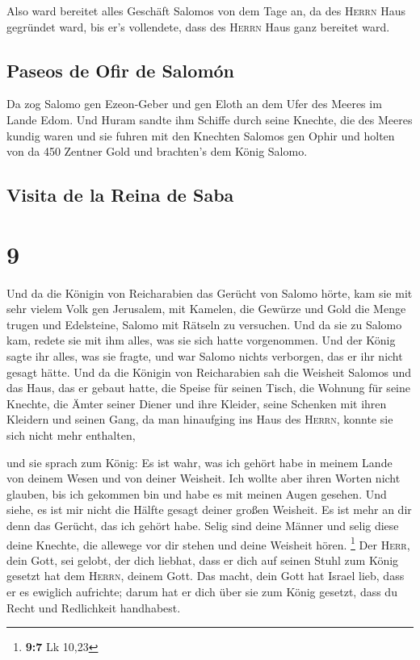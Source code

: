  Also ward bereitet alles Geschäft Salomos von dem Tage
an, da des \textsc{Herrn} Haus gegründet ward, bis er's vollendete, dass
des \textsc{Herrn} Haus ganz bereitet ward.

\hypertarget{paseos-de-ofir-de-salomuxf3n}{%
\subsection{Paseos de Ofir de
Salomón}\label{paseos-de-ofir-de-salomuxf3n}}

 Da zog Salomo gen Ezeon-Geber und gen Eloth an dem Ufer
des Meeres im Lande Edom.  Und Huram sandte ihm Schiffe
durch seine Knechte, die des Meeres kundig waren und sie fuhren mit den
Knechten Salomos gen Ophir und holten von da 450 Zentner Gold und
brachten's dem König Salomo.

\hypertarget{visita-de-la-reina-de-saba}{%
\subsection{Visita de la Reina de
Saba}\label{visita-de-la-reina-de-saba}}

\hypertarget{section-8}{%
\section{9}\label{section-8}}

 Und da die Königin von Reicharabien das Gerücht von
Salomo hörte, kam sie mit sehr vielem Volk gen Jerusalem, mit Kamelen,
die Gewürze und Gold die Menge trugen und Edelsteine, Salomo mit Rätseln
zu versuchen. Und da sie zu Salomo kam, redete sie mit ihm alles, was
sie sich hatte vorgenommen.  Und der König sagte ihr
alles, was sie fragte, und war Salomo nichts verborgen, das er ihr nicht
gesagt hätte.  Und da die Königin von Reicharabien sah die
Weisheit Salomos und das Haus, das er gebaut hatte,  die
Speise für seinen Tisch, die Wohnung für seine Knechte, die Ämter seiner
Diener und ihre Kleider, seine Schenken mit ihren Kleidern und seinen
Gang, da man hinaufging ins Haus des \textsc{Herrn}, konnte sie sich
nicht mehr enthalten,

 und sie sprach zum König: Es ist wahr, was ich gehört
habe in meinem Lande von deinem Wesen und von deiner Weisheit.
 Ich wollte aber ihren Worten nicht glauben, bis ich
gekommen bin und habe es mit meinen Augen gesehen. Und siehe, es ist mir
nicht die Hälfte gesagt deiner großen Weisheit. Es ist mehr an dir denn
das Gerücht, das ich gehört habe.  Selig sind deine Männer
und selig diese deine Knechte, die allewege vor dir stehen und deine
Weisheit hören. \footnote{\textbf{9:7} Lk 10,23}  Der
\textsc{Herr}, dein Gott, sei gelobt, der dich liebhat, dass er dich auf
seinen Stuhl zum König gesetzt hat dem \textsc{Herrn}, deinem Gott. Das
macht, dein Gott hat Israel lieb, dass er es ewiglich aufrichte; darum
hat er dich über sie zum König gesetzt, dass du Recht und Redlichkeit
handhabest.


